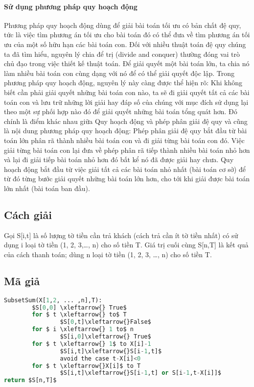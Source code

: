 \documentclass{article}
\begin{document}
\paragraph{Sử dụng phương pháp quy hoạch động }
Phương pháp quy hoạch động dùng để giải bài toán tối ưu có bản chất đệ quy, tức là việc tìm phương án tối ưu cho bài toán đó có thể đưa về tìm phương án tối ưu của một số hữu hạn các bài toán con. Đối với nhiều thuật toán đệ quy chúng ta đã tìm hiểu, nguyên lý chia để trị (divide and conquer) thường đóng vai trò chủ đạo trong việc thiết kế thuật toán. Để giải quyết một bài toán lớn, ta chia nó làm nhiều bài toán con cùng dạng với nó để có thể giải quyết độc lập. Trong phương pháp quy hoạch động, nguyên lý này càng được thể hiện rõ: 
Khi không biết cần phải giải quyết những bài toán con nào, ta sẽ đi giải quyết tất cả các bài toán con và lưu trữ những lời giải hay đáp số của chúng với mục đích sử dụng lại theo một sự phối hợp nào đó để giải quyết những bài toán tổng quát hơn. Đó chính là điểm khác nhau giữa Quy hoạch động và phép phân giải đệ quy và cũng là nội dung phương pháp quy hoạch động: 
Phép phân giải đệ quy bắt đầu từ bài toán lớn phân rã thành nhiều bài toán con và đi giải từng bài toán con đó. Việc giải từng bài toán con lại đưa về phép phân rã tiếp thành nhiều bài toán nhỏ hơn và lại đi giải tiếp bài toán nhỏ hơn đó bất kể nó đã được giải hay chưa. 
Quy hoạch động bắt đầu từ việc giải tất cả các bài toán nhỏ nhất (bài toán cơ sở) để từ đó từng bước giải quyết những bài toán lớn hơn, cho tới khi giải được bài toán lớn nhất (bài toán ban đầu). 
\subsection{Cách giải}
Gọi S[i,t] là số lượng tờ tiền cần trả khách (cách trả cần ít tờ tiền nhất) có sử dụng i loại tờ tiền (1, 2, 3,…, n) cho số tiền T.
Giá trị cuối cùng S[n,T] là kết quả của cách thanh toán; dùng n loại tờ tiền (1, 2, 3, …, n) cho số tiền T.
\subsection{Mã giả}
\lstset{style=mystyle_code}
\begin{lstlisting}[language=Python, caption=Mã giả subset sum, mathescape=true]
SubsetSum(X[1,2, ... ,n],T):  
    	$S[0,0] \xleftarrow{} True$ 
        for $ t \xleftarrow{} to$ T
        		$S[0,t]\xleftarrow{}False$  
        for $ i \xleftarrow{} 1 to$ n
        		$S[i,0]\xleftarrow{} True$   
        for $ t \xleftarrow{} 1$ to X[i]-1  
          		$S[i,t]\xleftarrow{}S[i-1,t]$    
          		avoid the case t-X[i]<0
        for $ t \xleftarrow{}X[i]$ to T 
         		$S[i,t]\xleftarrow{}S[i-1,t] or S[i-1,t-X[i]]$
return $S[n,T]$
\end{lstlisting}
\end{document}
